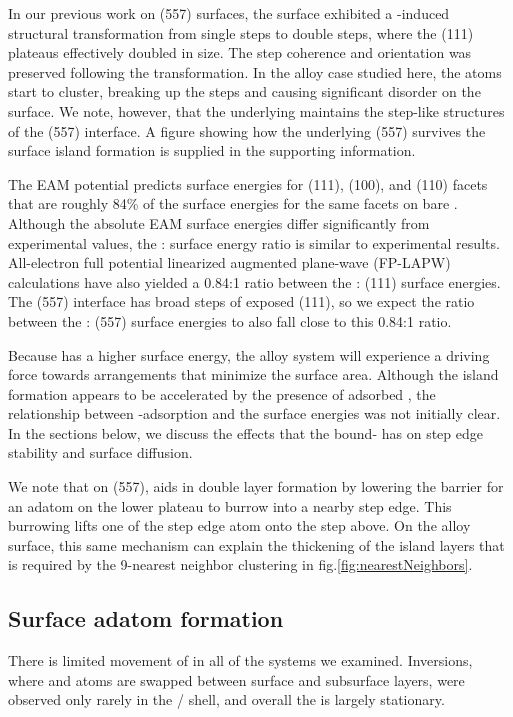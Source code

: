 \documentclass[journal = jpccck, manuscript = article]{achemso}
\begin{document}
In our previous work on (557) surfaces,\cite{Michalka:2013} the
surface exhibited a -induced structural transformation from
single steps to double steps, where the (111) plateaus effectively
doubled in size. The step coherence and orientation was preserved
following the transformation.  In the alloy case studied here, the
 atoms start to cluster, breaking up the steps and causing
significant disorder on the surface.  We note, however, that the
underlying  maintains the step-like structures of the (557)
interface.  A figure showing how the underlying (557) survives
the surface island formation is supplied in the supporting
information.

The EAM potential predicts surface energies for  (111), (100),
and (110) facets that are roughly 84\% of the surface energies for the
same facets on bare .\cite{EAM} Although the absolute EAM
surface energies differ significantly from experimental values, the
: surface energy ratio is similar to experimental
results.\cite{Tyson:1977xe,De-Boer:1988tg} All-electron full potential
linearized augmented plane-wave (FP-LAPW) calculations have also
yielded a 0.84:1 ratio between the : (111) surface
energies.\cite{Silva:2006fk} The (557) interface has broad steps of
exposed (111), so we expect the ratio between the :
(557) surface energies to also fall close to this 0.84:1 ratio.

Because  has a higher surface energy, the alloy system will
experience a driving force towards arrangements that minimize the
 surface area.  Although the  island formation appears
to be accelerated by the presence of adsorbed , the
relationship between -adsorption and the surface energies was
not initially clear. In the sections below, we discuss the effects
that the bound- has on step edge stability and surface
diffusion.

We note that on (557),  aids in double layer formation
by lowering the barrier for an adatom on the lower plateau to burrow
into a nearby step edge.\cite{Michalka:2013} This burrowing lifts one
of the step edge atom onto the step above.  On the alloy surface, this
same mechanism can explain the thickening of the  island layers
that is required by the 9-nearest neighbor clustering in
fig.\ref{fig:nearestNeighbors}.

\subsection{Surface adatom formation}
There is limited movement of  in all of the systems we
examined. Inversions, where  and  atoms are swapped
between surface and subsurface layers, were observed only rarely in
the / shell, and overall the  is largely
stationary.
\end{document}
